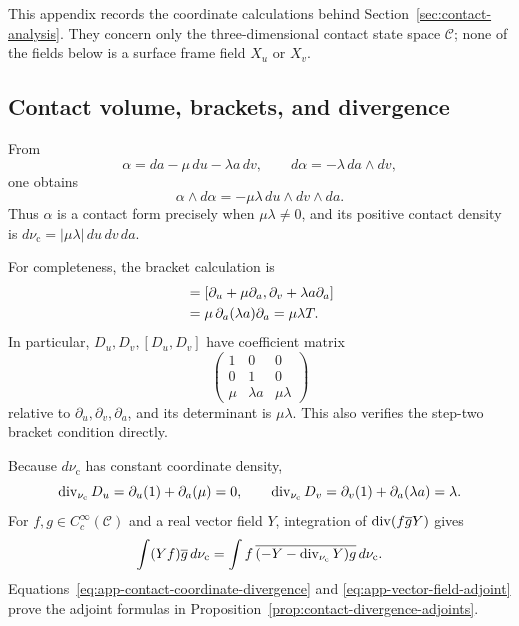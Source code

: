 This appendix records the coordinate calculations behind
Section~\ref{sec:contact-analysis}.  They concern only the three-dimensional
contact state space $\mathcal C$; none of the fields below is a surface frame
field $X_u$ or $X_v$.

\subsection{Contact volume, brackets, and divergence}

From
\[
 \alpha=da-\mu\,du-\lambda a\,dv,
 \qquad d\alpha=-\lambda\,da\wedge dv,
\]
one obtains
\begin{equation}\label{eq:app-contact-volume-signed}
 \alpha\wedge d\alpha
 =-\mu\lambda\,du\wedge dv\wedge da.
\end{equation}
Thus $\alpha$ is a contact form precisely when $\mu\lambda\ne0$, and its
positive contact density is
$d\nu_{\mathrm c}=|\mu\lambda|\,du\,dv\,da$.

For completeness, the bracket calculation is
\begin{align}
 [D_u,D_v]
 &=[\partial_u+\mu\partial_a,
       \partial_v+\lambda a\partial_a]\notag\\
 &=\mu\,\partial_a(\lambda a)\partial_a
 =\mu\lambda T.\label{eq:app-contact-bracket}
\end{align}
In particular, $D_u,D_v,[D_u,D_v]$ have coefficient matrix
\[
 \begin{pmatrix}
  1&0&0\\
  0&1&0\\
  \mu&\lambda a&\mu\lambda
 \end{pmatrix}
\]
relative to $\partial_u,\partial_v,\partial_a$, and its determinant is
$\mu\lambda$.  This also verifies the step-two bracket condition directly.

Because $d\nu_{\mathrm c}$ has constant coordinate density,
\begin{equation}\label{eq:app-contact-coordinate-divergence}
 \operatorname{div}_{\nu_{\mathrm c}}D_u
 =\partial_u(1)+\partial_a(\mu)=0,
 \qquad
 \operatorname{div}_{\nu_{\mathrm c}}D_v
 =\partial_v(1)+\partial_a(\lambda a)=\lambda.
\end{equation}
For $f,g\in C_c^\infty(\mathcal C)$ and a real vector field $Y$,
integration of $\operatorname{div}(f\overline gY)$ gives
\begin{equation}\label{eq:app-vector-field-adjoint}
 \int(Yf)\overline g\,d\nu_{\mathrm c}
 =\int f\,\overline{(-Y-\operatorname{div}_{\nu_{\mathrm c}}Y)g}
      \,d\nu_{\mathrm c}.
\end{equation}
Equations~\eqref{eq:app-contact-coordinate-divergence} and
\eqref{eq:app-vector-field-adjoint} prove the adjoint formulas in
Proposition~\ref{prop:contact-divergence-adjoints}.

